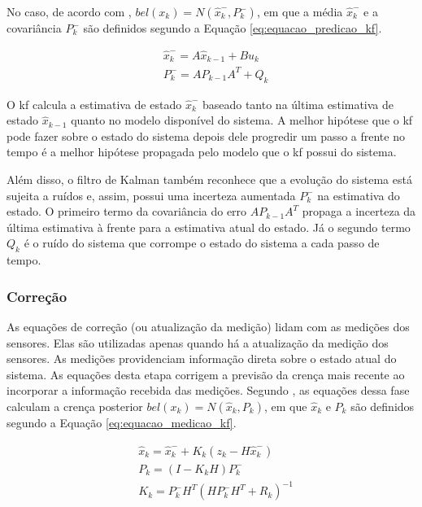 \documentclass[acronym, symbols, table]{fei}
\begin{document}
				No caso, de acordo com \textcite{thrun2002probabilistic}, $bel(x_k) = N(\hat{x}_{k}^{-},P_{k}^{-})$, em que a média $\hat{x}_{k}^{-}$ e a covariância $P_{k}^{-}$ são definidos segundo a Equação \eqref{eq:equacao_predicao_kf}.
				
				\begin{equation} \label{eq:equacao_predicao_kf}
					\begin{split}
						&\hat{x}_{k}^{-} = A\hat{x}_{k-1} + Bu_{k} \\
						&P_{k}^{-} = AP_{k-1}A^{T} + Q_{k}					
					\end{split}
				\end{equation}
			
				O \acrshort{kf} calcula a estimativa de estado $\hat{x}_{k}^{-}$ baseado tanto na última estimativa de estado $\hat{x}_{k-1}$ quanto no modelo disponível do sistema. A melhor hipótese que o \acrshort{kf} pode fazer sobre o estado do sistema depois dele progredir um passo a frente no tempo é a melhor hipótese propagada pelo modelo que o \acrshort{kf} possui do sistema.
				
				Além disso, o filtro de Kalman também reconhece que a evolução do sistema está sujeita a ruídos e, assim, possui uma incerteza aumentada $P_{k}^{-}$ na estimativa do estado. O primeiro termo da covariância do erro $AP_{k-1}A^{T}$ propaga a incerteza da última estimativa à frente para a estimativa atual do estado. Já o segundo termo $Q_{k}$ é o ruído do sistema que corrompe o estado do sistema a cada passo de tempo.
			
			\subsubsection{Correção}
			
				As equações de correção (ou atualização da medição) lidam com as medições dos sensores. Elas são utilizadas apenas quando há a atualização da medição dos sensores. As medições providenciam informação direta sobre o estado atual do sistema. As equações desta etapa corrigem a previsão da crença mais recente ao incorporar a informação recebida das medições. Segundo \textcite{thrun2002probabilistic}, as equações dessa fase calculam a crença posterior $bel(x_k) = N(\hat{x}_{k},P_{k})$, em que $\hat{x}_{k}$ e $P_{k}$ são definidos segundo a Equação \eqref{eq:equacao_medicao_kf}.
				
				\begin{equation} \label{eq:equacao_medicao_kf}
					\begin{split}
						&\hat{x}_{k} = \hat{x}_{k}^{-} + K_{k}(z_k - H\hat{x}_{k}^{-}) \\
						&P_{k} = (I - K_kH)P_{k}^{-} \\
						&K_k =  P_{k}^{-}H^T(HP_{k}^{-}H^T + R_k)^{-1}
					\end{split}
				\end{equation}
			
\end{document}
